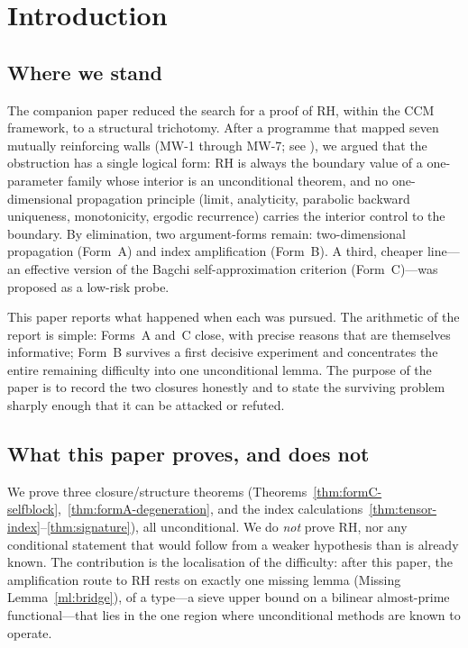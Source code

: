 \documentclass[11pt]{amsart}
\theoremstyle{definition}
\theoremstyle{remark}
\begin{document}
\maketitle
\tableofcontents
\newpage

\section{Introduction}

\subsection{Where we stand}
The companion paper \cite{P41} reduced the search for a proof of RH, within
the CCM framework, to a structural trichotomy. After a programme that
mapped seven mutually reinforcing walls (MW-1 through MW-7; see
\cite{P41,P40}), we argued that the obstruction has a single logical form:
RH is always the boundary value of a one-parameter family whose interior is
an unconditional theorem, and no one-dimensional propagation principle
(limit, analyticity, parabolic backward uniqueness, monotonicity, ergodic
recurrence) carries the interior control to the boundary. By elimination,
two argument-forms remain: two-dimensional propagation (Form~A) and index
amplification (Form~B). A third, cheaper line---an effective version of the
Bagchi self-approximation criterion (Form~C)---was proposed as a low-risk
probe.

This paper reports what happened when each was pursued. The arithmetic of
the report is simple: Forms~A and~C close, with precise reasons that are
themselves informative; Form~B survives a first decisive experiment and
concentrates the entire remaining difficulty into one unconditional lemma.
The purpose of the paper is to record the two closures honestly and to
state the surviving problem sharply enough that it can be attacked or
refuted.

\subsection{What this paper proves, and does not}
We prove three closure/structure theorems
(Theorems~\ref{thm:formC-selfblock},~\ref{thm:formA-degeneration},
and the index calculations~\ref{thm:tensor-index}--\ref{thm:signature}),
all unconditional. We do \emph{not} prove RH, nor any conditional statement
that would follow from a weaker hypothesis than is already known. The
contribution is the localisation of the difficulty: after this paper, the
amplification route to RH rests on exactly one missing lemma
(Missing Lemma~\ref{ml:bridge}), of a type---a sieve upper bound on a
bilinear almost-prime functional---that lies in the one region where
unconditional methods are known to operate.
\end{document}
